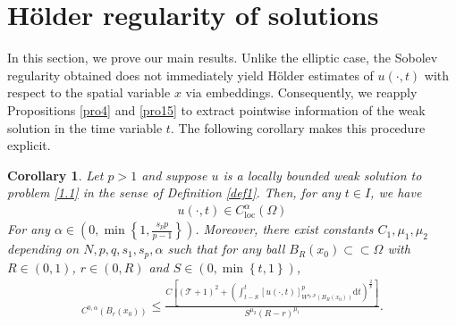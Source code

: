\documentclass[reqno,10pt]{amsart}
\numberwithin{equation}{section}
\newtheorem{corollary}[theorem]{Corollary}
\begin{document}
\section{H\"{o}lder regularity of solutions}
\label{sec5}
In this section, we prove our main results. Unlike the elliptic case, the Sobolev regularity obtained does not immediately yield H\"{o}lder estimates of $u(\cdot,t)$ with respect to the spatial variable $x$ via embeddings. Consequently, we reapply Propositions \ref{pro4} and \ref{pro15} to extract pointwise information of the weak solution in the time variable \(t\). The following corollary makes this procedure explicit.
\begin{corollary}
	\label{cor22}
	Let $p>1$ and suppose $u$ is a locally bounded weak solution to problem \eqref{1.1} in the sense of Definition \ref{def1}. Then, for any $t\in I $, we have
	\begin{align*}
		u(\cdot,t)\in C^\alpha_\mathrm{loc}(\Omega)
	\end{align*}
	For any $\alpha\in\left( 0,\min\left\lbrace 1,\frac{s_pp}{p-1}\right\rbrace \right) $. Moreover, there exist constants $C_1,\mu_1,\mu_2$ depending on $N,p,q,s_1,s_p,\alpha$ such that for any ball $B_R(x_0)\subset\subset\Omega$ with $R\in(0,1)$, $r\in(0,R)$ and $S\in\left( 0,\min\left\lbrace t,1\right\rbrace \right) $,
	\begin{align*}
		[u(\cdot,t)]_{C^{0,\alpha}(B_r(x_0))}\le \frac{C\left[ \left( \mathcal{T}+1\right)^2+\left( \int_{t-S}^{t}[u(\cdot,t)]^p_{W^{s_p,p}\left( B_R(x_0)\right)}\mathrm{d}t\right)^{\frac{2}{p}}\right] }{S^{\mu_2}(R-r)^{\mu_1}}.
	\end{align*}
\end{corollary}
\end{document}
